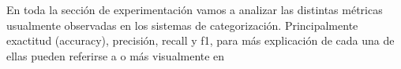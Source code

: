 En toda la sección de experimentación vamos a analizar las distintas métricas usualmente observadas en los sistemas de categorización. Principalmente exactitud (accuracy), precisión, recall y f1, para más explicación de cada una de ellas pueden referirse a \cite{metricasPaper} o más visualmente en \cite{metricasWeb}


\FloatBarrier
\newpage

\FloatBarrier
\newpage

